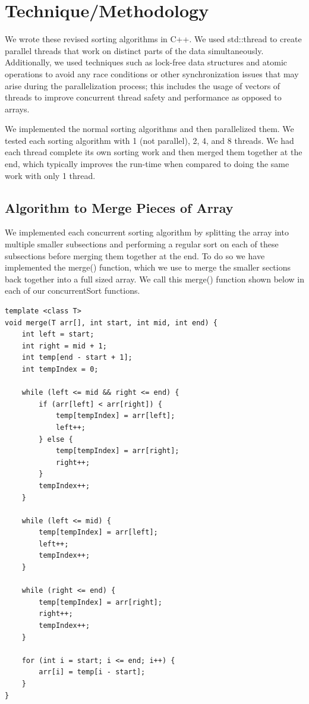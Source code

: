 \documentclass[conference]{IEEEtran}
\begin{document}
\section{Technique/Methodology}
We wrote these revised sorting algorithms in C++. We used std::thread to create parallel threads that work on distinct parts of the data simultaneously. Additionally, we used techniques such as lock-free data structures and atomic operations to avoid any race conditions or other synchronization issues that may arise during the parallelization process; this includes the usage of vectors of threads to improve concurrent thread safety and performance as opposed to arrays.

We implemented the normal sorting algorithms and then parallelized them. We tested each sorting algorithm with 1 (not parallel), 2, 4, and 8 threads. We had each thread complete its own sorting work and then merged them together at the end, which typically improves the run-time when compared to doing the same work with only 1 thread.

\subsection{Algorithm to Merge Pieces of Array}
We implemented each concurrent sorting algorithm by splitting the array into multiple smaller subsections and performing a regular sort on each of these subsections before merging them together at the end. To do so we have implemented the merge() function, which we use to merge the smaller sections back together into a full sized array. We call this merge() function shown below in each of our concurrentSort functions. 
\begin{lstlisting}
template <class T>
void merge(T arr[], int start, int mid, int end) {
    int left = start;
    int right = mid + 1;
    int temp[end - start + 1];
    int tempIndex = 0;

    while (left <= mid && right <= end) {
        if (arr[left] < arr[right]) {
            temp[tempIndex] = arr[left];
            left++;
        } else {
            temp[tempIndex] = arr[right];
            right++;
        }
        tempIndex++;
    }

    while (left <= mid) {
        temp[tempIndex] = arr[left];
        left++;
        tempIndex++;
    }

    while (right <= end) {
        temp[tempIndex] = arr[right];
        right++;
        tempIndex++;
    }

    for (int i = start; i <= end; i++) {
        arr[i] = temp[i - start];
    }
}
\end{lstlisting}
\end{document}
